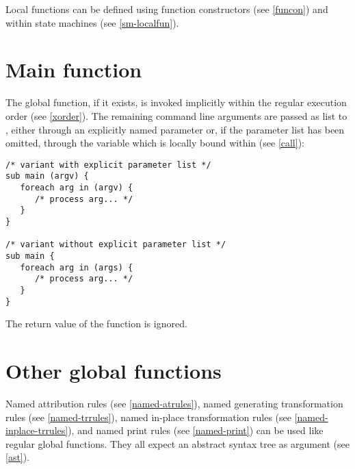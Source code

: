 Local functions can be defined using function
constructors (see \ref{funcon}) and within state machines (see
\ref{sm-localfun}).

\section{Main function}

The global  function, if it exists, is invoked implicitly
within the regular execution order (see \ref{xorder}). The remaining
command line arguments are passed as list
to , either through an explicitly named parameter
or, if the parameter list has been omitted, through the variable
 which is locally bound within 
(see \ref{call}):

\begin{lstlisting}
/* variant with explicit parameter list */
sub main (argv) {
   foreach arg in (argv) {
      /* process arg... */
   }
}

/* variant without explicit parameter list */
sub main {
   foreach arg in (args) {
      /* process arg... */
   }
}
\end{lstlisting}

\noindent
The return value of the  function is ignored.

\section{Other global functions}

Named attribution rules (see \ref{named-atrules}),
named generating transformation rules (see \ref{named-trrules}),
named in-place transformation rules (see \ref{named-inplace-trrules}),
and named print rules (see \ref{named-print}) can be
used like regular global functions. They all expect an
abstract syntax tree as argument (see \ref{ast}).

\endinput
